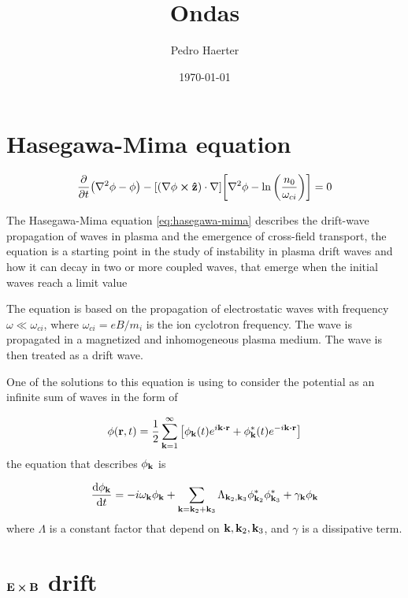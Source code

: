 \documentclass[12pt, a4paper]{article}
\author{Pedro Haerter}
\title{Ondas}
\date{\today}
\begin{document}
\maketitle
\onehalfspacing 

\section{Hasegawa-Mima equation}

\begin{equation}
	\pdv{t}(\nabla^2\phi-\phi)-\qty[(\nabla\phi\cp\vb{\hat{z}})\cdot\nabla]\qty[\nabla^2\phi-\ln\qty(\frac{n_0}{\omega_{ci}})]=0
	\label{eq:hasegawa-mima}
\end{equation}

The Hasegawa-Mima equation \ref{eq:hasegawa-mima}  describes the drift-wave propagation of waves in plasma and the emergence of cross-field transport, the equation is a starting point in the study of instability in plasma drift waves and how it can decay in two or more coupled waves, that emerge when the initial waves reach a limit value

The equation is based on the propagation of electrostatic waves with frequency $\omega\ll\omega_{ci}$, where $\omega_{ci}=eB/m_i$ is the ion cyclotron frequency. The wave is propagated in a magnetized and inhomogeneous plasma medium.  The wave is then treated as a drift wave.

One of the solutions to this equation is using to consider the potential as an infinite sum of waves in the form of 

\begin{equation}
	\phi(\vb{r},t)=\frac{1}{2} \sum_{\vb{k}=1}^{\infty}\qty[\phi_{\vb{k}}(t)e^{i\vb{k}\vdot\vb{r}}+\phi^*_{\vb{k}}(t)e^{-i\vb{k}\vdot\vb{r}}]
\end{equation}
the equation that describes $\phi_{\vb{k}}$ is 

\begin{equation}
	\dv{\phi_{\vb{k}}}{t}=-i\omega_{\vb{k}}\phi_{\vb{k}}+\sum_{\vb{k}=\vb{k}_2+\vb{k}_3}\Lambda_{\vb{k}_2,\vb{k}_3} \phi_{\vb{k}_2}^*\phi_{\vb{k}_3}^* +\gamma_{\vb{k}}\phi_{\vb{k}}
	\label{eq:sol_hwm}
\end{equation}
where $\Lambda$ is a constant factor that depend on $\vb{k},\vb{k}_2,\vb{k}_3$, and $\gamma$ is a dissipative term.

\section{$\vb{E}\cp\vb{B}$ drift}
\end{document}
